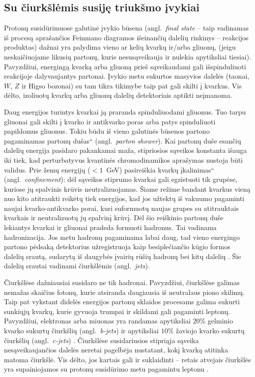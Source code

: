 \documentclass[a4paper, 12pt, oneside]{article}
\newcommand{\ltq}[1]{{\quotedblbase{}#1\textquotedblleft{}}}
\newlength\q
\begin{document}
\subsection{Su čiurkšlėmis susiję triukšmo įvykiai}\label{sec:jets}
Protonų susidūrimuose galutinė įvykio būsena (angl.\ \textit{final state} -- taip vadinamas iš procesą aprašančios
Feinmano diagramos išeinančių dalelių rinkinys -- reakcijos produktas) dažnai yra palydima vieno ar kelių kvarkų ir/arba gliuonų,
(jeigu neskaičiuojame likusių partonų, kurie nesusąveikauja ir nulekia apytiksliai tiesiai).
Pavyzdžiui, energingą kvarką arba gliuoną prieš sąveikaudami gali išspinduliuoti reakcijoje dalyvaujantys partonai.
Įvykio metu sukurtos masyvios dalelės (taonai, $W$, $Z$ ir Higso bozonai) su tam tikra tikimybe taip pat gali skilti į kvarkus.
Vis dėlto, izoliuotų kvarkų arba gliuonų dalelių detektoriais aptikti neįmanoma.

Daug energijos turintys kvarkai ją praranda spinduliuodami gliuonus.
Tuo tarpu gliuonai gali skilti į kvarko ir antikvarko poras arba patys spinduliuoti papildomus gliuonus.
Tokiu būdu iš vieno galutinės būsenos partono pagaminamas \ltq{partonų dušas} (angl.\ \textit{parton shower}).
Kai partonų duše esančių dalelių energija pasidaro pakankamai maža, stipriosios sąveikos konstanta išauga iki
tiek, kad perturbatyvus kvantinės chromodinamikos aprašymas nustoja būti validus.
Prie žemų energijų ($<\!1$~GeV) pasireiškia kvarkų \ltq{įkalinimas} (angl.\ \textit{confinement}): dėl sąveikos stiprumo
kvarkai gali egzistuoti tik grupėse, kuriose jų spalvinis krūvis neutralizuojamas.
Šiame režime bandant kvarkus vieną nuo kito atitraukti reikėtų tiek energijos, kad jos užtektų iš vakuumo pagaminti
naujai kvarko-antikvarko porai, kuri suformuotų naujas grupes su atitrauktais kvarkais ir neutralizuotų jų spalvinį krūvį.
Dėl šio reiškinio partonų duše lekiantys kvarkai ir gliuonai pradeda formuoti hadronus.
Tai vadinama hadronizacija.
Jos metu hadronų pagaminama labai daug, tad vieno energingo partono pėdsaką detektorius užregistruoja kaip besiplečiančio
kūgio formos dalelių srautą, sudarytą iš daugybės įvairių rūšių hadronų bei kitų dalelių \cite{Jets}.
Šie dalelių srautai vadinami čiurkšlėmis (angl.\ \textit{jets}).

Čiurkšlėse dažniausiai susidaro ne tik hadronai.
Pavyzdžiui, čiurkšlėse galimas nemažas skaičius fotonų, kurie atsiranda daugiausia iš neutralaus piono skilimų.
Taip pat vykstant didelės energijos partonų sklaidos procesams galima sukurti sunkiųjų kvarkų, kurie gyvuoja trumpai
ir skildami gali pagaminti leptonų.
Pavyzdžiui, elektronas arba miuonas yra randamas apytiksliai $20\%$ gelminio kvarko sukurtų čiurkšlių
(angl.\ \textit{b-jets}) ir apytiksliai $10\%$ žaviojo kvarko sukurtų čiurkšlių (angl.\ \textit{c-jets}) \cite{LeptonJets}.
Čiurkšlėse susidariusios stipriąja sąveika nesąveikaujančios dalelės neretai pagelbėja nustatant,
kokį kvarką atitinka matoma čiurkšlė.
Vis dėlto, jos kartais gali ir suklaidinti -- retais atvejais čiurkšlės yra supainiojamos su protonų susidūrimo metu
pagamintu leptonu
\cite{DY_CMS2011, DY_CMS2013, DY_ATLAS2013, DY_ATLAS2014, DY_CMS2015, DY_ATLAS2016, DY_ATLAS2017, DY_CMS2019, EleID, MuonID}.
\end{document}
